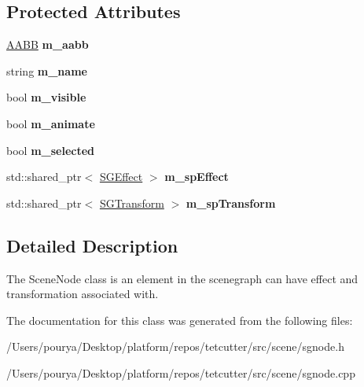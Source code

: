 \subsection*{Protected Attributes}
\begin{DoxyCompactItemize}
\item 
\hypertarget{classps_1_1scene_1_1SGNode_a6f34ae5f7e3e364a097f38052e312d14}{}\hyperlink{classps_1_1base_1_1AABB}{A\+A\+B\+B} {\bfseries m\+\_\+aabb}\label{classps_1_1scene_1_1SGNode_a6f34ae5f7e3e364a097f38052e312d14}

\item 
\hypertarget{classps_1_1scene_1_1SGNode_ab138751ca18f8c4abbd659131510987f}{}string {\bfseries m\+\_\+name}\label{classps_1_1scene_1_1SGNode_ab138751ca18f8c4abbd659131510987f}

\item 
\hypertarget{classps_1_1scene_1_1SGNode_acf56b812a560048ac80c5b8af5e83554}{}bool {\bfseries m\+\_\+visible}\label{classps_1_1scene_1_1SGNode_acf56b812a560048ac80c5b8af5e83554}

\item 
\hypertarget{classps_1_1scene_1_1SGNode_a2ce4ff6c162645183409a6c9a7130c00}{}bool {\bfseries m\+\_\+animate}\label{classps_1_1scene_1_1SGNode_a2ce4ff6c162645183409a6c9a7130c00}

\item 
\hypertarget{classps_1_1scene_1_1SGNode_a6596ed2743cf693a8707ff61a03203e8}{}bool {\bfseries m\+\_\+selected}\label{classps_1_1scene_1_1SGNode_a6596ed2743cf693a8707ff61a03203e8}

\item 
\hypertarget{classps_1_1scene_1_1SGNode_a4a7f4fc053955264adcafe62903ae94e}{}std\+::shared\+\_\+ptr$<$ \hyperlink{classps_1_1scene_1_1SGEffect}{S\+G\+Effect} $>$ {\bfseries m\+\_\+sp\+Effect}\label{classps_1_1scene_1_1SGNode_a4a7f4fc053955264adcafe62903ae94e}

\item 
\hypertarget{classps_1_1scene_1_1SGNode_ac3ee6a415828679621309e0a8db3f0e8}{}std\+::shared\+\_\+ptr$<$ \hyperlink{classps_1_1scene_1_1SGTransform}{S\+G\+Transform} $>$ {\bfseries m\+\_\+sp\+Transform}\label{classps_1_1scene_1_1SGNode_ac3ee6a415828679621309e0a8db3f0e8}

\end{DoxyCompactItemize}


\subsection{Detailed Description}
The Scene\+Node class is an element in the scenegraph can have effect and transformation associated with. 

The documentation for this class was generated from the following files\+:\begin{DoxyCompactItemize}
\item 
/\+Users/pourya/\+Desktop/platform/repos/tetcutter/src/scene/sgnode.\+h\item 
/\+Users/pourya/\+Desktop/platform/repos/tetcutter/src/scene/sgnode.\+cpp\end{DoxyCompactItemize}
